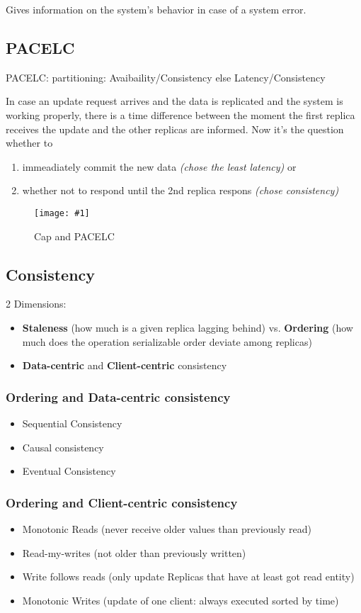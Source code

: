 \documentclass[a4paper,12pt]{article}%
\newcommand{\grafik}[2]{\begin{figure}[!htb]
		\noindent\texttt{[image: \#1]}
		\caption{\textrm{#2}}%
	\end{figure}}
\begin{document}
Gives information on the system's behavior in case of a system error.

\subsection{PACELC}
PACELC: partitioning: Avaibaility/Consistency else Latency/Consistency

In case an update request arrives and the data is replicated and the system is working properly,
there is a time difference between the moment the first replica receives the update and the other replicas are informed.
Now it's the question whether to 
\begin{enumerate}
 \item immeadiately commit the new data {\it (chose the least latency)} or 
 \item whether not to respond until the 2nd replica respons {\it (chose consistency)} 
\end{enumerate}
\grafik{zusa2/00.png}{Cap and PACELC}

\subsection{Consistency}
2 Dimensions:
\begin{itemize}
	\item {\bf Staleness} (how much is a given replica lagging behind) vs. {\bf Ordering} (how much does the operation serializable order deviate among replicas)
	\item {\bf Data-centric} and {\bf Client-centric} consistency
\end{itemize}

\subsubsection{Ordering and Data-centric consistency}
\begin{itemize}
\item Sequential Consistency 
\item Causal consistency
\item Eventual Consistency
\end{itemize}
\subsubsection{Ordering and Client-centric consistency}
\begin{itemize}
	\item Monotonic Reads (never receive older values than previously read)
	\item Read-my-writes (not older than previously written)
	\item Write follows reads (only update Replicas that have at least got read entity)
	\item Monotonic Writes (update of one client: always executed sorted by time)
\end{itemize}
\newpage
 
\end{document}
